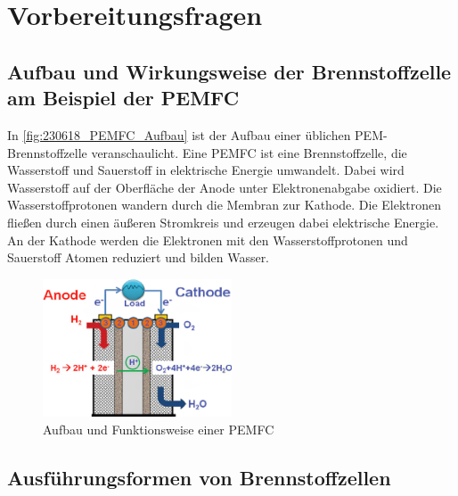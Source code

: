 \section{Vorbereitungsfragen}
\label{sec:Vorbereitungsfragen}

\subsection{Aufbau und Wirkungsweise der Brennstoffzelle am Beispiel der PEMFC}
In \autoref{fig:230618_PEMFC_Aufbau} ist der Aufbau einer üblichen PEM-Brennstoffzelle veranschaulicht. 
Eine PEMFC ist eine Brennstoffzelle, die Wasserstoff und Sauerstoff in elektrische Energie umwandelt.
Dabei wird Wasserstoff auf der Oberfläche der Anode unter Elektronenabgabe oxidiert.
Die Wasserstoffprotonen wandern durch die Membran zur Kathode.
Die Elektronen fließen durch einen äußeren Stromkreis und erzeugen dabei elektrische Energie.
An der Kathode werden die Elektronen mit den Wasserstoffprotonen und Sauerstoff Atomen reduziert und bilden Wasser.

\begin{figure}[H]
    \centering
    \includegraphics[width=0.5\textwidth]{Abbildungen/PEMFC_Aufbau.png}
    \caption{Aufbau und Funktionsweise einer PEMFC \cite{PEMFC}}
    \label{fig:230618_PEMFC_Aufbau}
\end{figure}

\subsection{Ausführungsformen von Brennstoffzellen}

